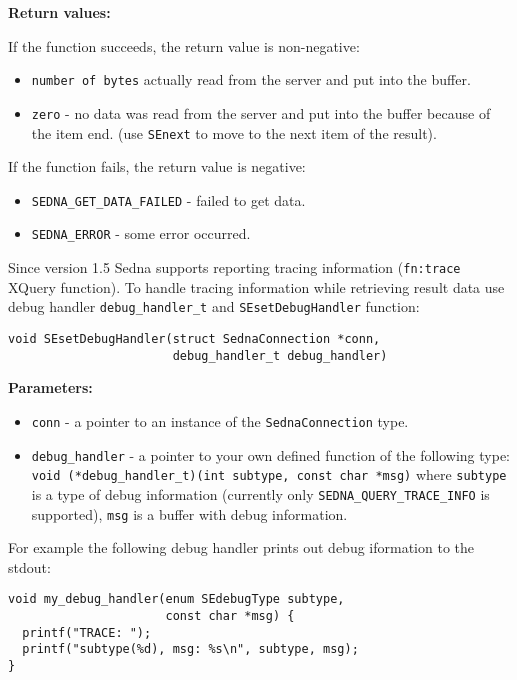 \documentclass[a4paper,12pt]{article}
\newenvironment{citemize}
{\begin{itemize}
  \setlength{\itemsep}{0pt}
  \setlength{\parskip}{0pt}
  \setlength{\parsep}{0pt}}
{\end{itemize}}
\begin{document}
\noindent
\textbf{Return values:}

\medskip

\noindent
If the function succeeds, the return value is non-negative:

\begin{citemize}
\item\verb!number of bytes! actually read from the server and put into the
buffer.
\item\verb!zero! - no data was read from the server and put into the buffer
because of the item end. (use \verb!SEnext! to move to the next item of the
result).
\end{citemize}

\noindent
If the function fails, the return value is negative:

\begin{citemize}
\item\verb!SEDNA_GET_DATA_FAILED! - failed to get data.
\item\verb!SEDNA_ERROR! - some error occurred.
\end{citemize}

Since version 1.5 Sedna supports reporting tracing information (\verb!fn:trace!
XQuery function). To handle tracing information while retrieving result data use
debug handler \verb!debug_handler_t! and \verb!SEsetDebugHandler! function:

\begin{verbatim}
void SEsetDebugHandler(struct SednaConnection *conn,
                       debug_handler_t debug_handler)
\end{verbatim}

\noindent
\textbf{Parameters:}

\begin{citemize}
\item\verb!conn! - a pointer to an instance of the \verb!SednaConnection! type.
\item\verb!debug_handler! - a pointer to your own defined function of the
following type: \verb!void (*debug_handler_t)(int subtype, const char *msg)!
where \verb!subtype! is a type of debug information (currently only
\verb!SEDNA_QUERY_TRACE_INFO! is supported), \verb!msg! is a buffer with debug
information.
\end{citemize}

For example the following debug handler prints out debug iformation to the 
stdout:

\small{
\begin{verbatim}
void my_debug_handler(enum SEdebugType subtype, 
                      const char *msg) {
  printf("TRACE: ");
  printf("subtype(%d), msg: %s\n", subtype, msg);
}
\end{verbatim}}
\end{document}
